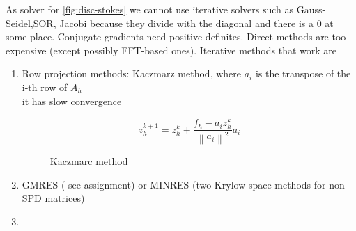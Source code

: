 \documentclass[a4paper,11pt]{scrartcl}
\begin{document}
As solver for \ref{fig:disc-stokes} we cannot use iterative solvers such as Gauss-Seidel,SOR, Jacobi because they divide with the diagonal and there is a $0$ at some place. Conjugate gradients need positive definites. Direct methods are too expensive (except possibly FFT-based ones). Iterative methods that work are
\begin{enumerate}
	\item Row projection methods: Kaczmarz method, where $a_i$ is the transpose of the i-th row of $A_h$ \\
	it has slow convergence %
\begin{figure}[H]
	\centering
	\[ z_h^{k+1} = z_h^k + \frac{f_h - a_i z_h^k}{\left\lVert a_i \right\rVert^2}a_i \]
	\renewcommand{\thefigure}{S16}
	\caption{Kaczmarc method}
	\label{fig:disc-freesplipb}
\end{figure}


	\item GMRES ( see assignment) or MINRES (two Krylow space methods for non-SPD matrices)
	
	\item %
\end{enumerate}
\end{document}
